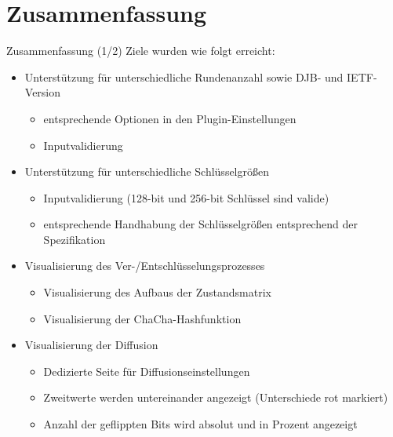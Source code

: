\documentclass{beamer}
\begin{document}
\section{Zusammenfassung}
\begin{frame}{Zusammenfassung (1/2)}
Ziele wurden wie folgt erreicht:
\begin{itemize}
\item Unterstützung für unterschiedliche Rundenanzahl sowie DJB- und IETF-Version
\begin{itemize}
\item entsprechende Optionen in den Plugin-Einstellungen
\item Inputvalidierung
\end{itemize}
\item Unterstützung für unterschiedliche Schlüsselgrößen \\
\begin{itemize}
\item Inputvalidierung (128-bit und 256-bit Schlüssel sind valide)
\item entsprechende Handhabung der Schlüsselgrößen entsprechend der Spezifikation
\end{itemize}
\item Visualisierung des Ver-/Entschlüsselungsprozesses \\
\begin{itemize}
\item Visualisierung des Aufbaus der Zustandsmatrix
\item Visualisierung der ChaCha-Hashfunktion
\end{itemize}
\item Visualisierung der Diffusion
\begin{itemize}
\item Dedizierte Seite für Diffusionseinstellungen
\item Zweitwerte werden untereinander angezeigt (Unterschiede rot markiert)
\item Anzahl der geflippten Bits wird absolut und in Prozent angezeigt
\end{itemize}
\end{itemize}
\end{frame}
\end{document}
